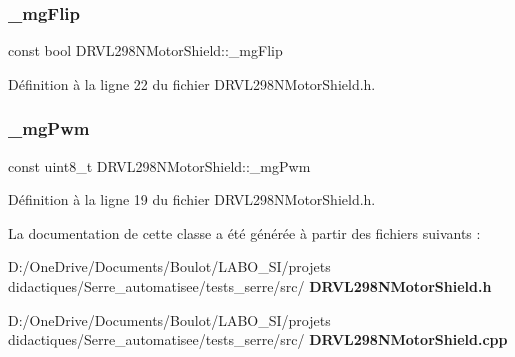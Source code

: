 \subsubsection{\+\_\+mg\+Flip}
{\footnotesize\ttfamily const bool D\+R\+V\+L298\+N\+Motor\+Shield\+::\+\_\+mg\+Flip\hspace{0.3cm}{\ttfamily [private]}}



Définition à la ligne 22 du fichier D\+R\+V\+L298\+N\+Motor\+Shield.\+h.

\mbox{\label{class_d_r_v_l298_n_motor_shield_aa893ef6b1bb8bf81a7b4e061270c4f9a}} 
\subsubsection{\+\_\+mg\+Pwm}
{\footnotesize\ttfamily const uint8\+\_\+t D\+R\+V\+L298\+N\+Motor\+Shield\+::\+\_\+mg\+Pwm\hspace{0.3cm}{\ttfamily [private]}}



Définition à la ligne 19 du fichier D\+R\+V\+L298\+N\+Motor\+Shield.\+h.



La documentation de cette classe a été générée à partir des fichiers suivants \+:\begin{DoxyCompactItemize}
\item 
D\+:/\+One\+Drive/\+Documents/\+Boulot/\+L\+A\+B\+O\+\_\+\+S\+I/projets didactiques/\+Serre\+\_\+automatisee/tests\+\_\+serre/src/\textbf{ D\+R\+V\+L298\+N\+Motor\+Shield.\+h}\item 
D\+:/\+One\+Drive/\+Documents/\+Boulot/\+L\+A\+B\+O\+\_\+\+S\+I/projets didactiques/\+Serre\+\_\+automatisee/tests\+\_\+serre/src/\textbf{ D\+R\+V\+L298\+N\+Motor\+Shield.\+cpp}\end{DoxyCompactItemize}
